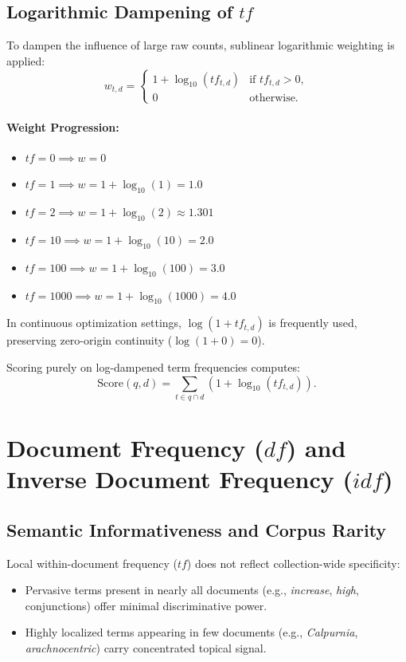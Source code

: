 \subsection[Logarithmic Dampening of tf]{Logarithmic Dampening of $tf$}
To dampen the influence of large raw counts, sublinear logarithmic weighting is applied:
\begin{equation}
w_{t,d} = \begin{cases} 1 + \log_{10}(tf_{t,d}) & \text{if } tf_{t,d} > 0, \\ 0 & \text{otherwise.} \end{cases}
\end{equation}

\paragraph{Weight Progression:}
\begin{itemize}
    \item $tf = 0 \implies w = 0$
    \item $tf = 1 \implies w = 1 + \log_{10}(1) = 1.0$
    \item $tf = 2 \implies w = 1 + \log_{10}(2) \approx 1.301$
    \item $tf = 10 \implies w = 1 + \log_{10}(10) = 2.0$
    \item $tf = 100 \implies w = 1 + \log_{10}(100) = 3.0$
    \item $tf = 1000 \implies w = 1 + \log_{10}(1000) = 4.0$
\end{itemize}
In continuous optimization settings, $\log(1 + tf_{t,d})$ is frequently used, preserving zero-origin continuity ($\log(1+0)=0$).

Scoring purely on log-dampened term frequencies computes:
\begin{equation}
\text{Score}(q, d) = \sum_{t \in q \cap d} \left( 1 + \log_{10}(tf_{t,d}) \right).
\end{equation}

\FloatBarrier
\section[Document Frequency (df) and Inverse Document Frequency (idf)]{Document Frequency ($df$) and\\ Inverse Document Frequency ($idf$)}
\label{sec:df-idf-en}

\subsection{Semantic Informativeness and Corpus Rarity}
Local within-document frequency ($tf$) does not reflect collection-wide specificity:
\begin{itemize}
    \item Pervasive terms present in nearly all documents (e.g., \textit{increase}, \textit{high}, conjunctions) offer minimal discriminative power.
    \item Highly localized terms appearing in few documents (e.g., \textit{Calpurnia}, \textit{arachnocentric}) carry concentrated topical signal.
\end{itemize}

